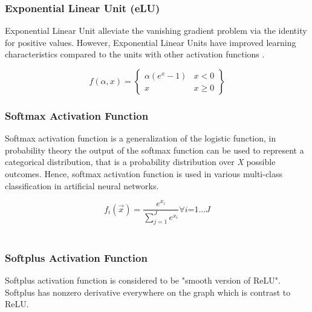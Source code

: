 \documentclass[12pt, a4paper]{report}
\begin{document}
\subsubsection{Exponential Linear Unit (eLU)}\label{sec:ELU}
Exponential Linear Unit alleviate the vanishing gradient problem via the identity for positive values. However, Exponential Linear Units have improved learning characteristics compared to the units with other activation functions \cite{ELU}.\\ \par
\begin{equation}\label{eq:ELU}
f(\alpha ,x) = \begin{Bmatrix}
\alpha(e^{x}-1) & x<0\\ 
x & x\geq 0 
\end{Bmatrix}
\end{equation}

\subsubsection{Softmax Activation Function}\label{sec:softmax}
Softmax activation function is a generalization of the logistic function, in probability theory the output of the softmax function can be used to represent a categorical distribution, that is a probability distribution over \textit{X} possible outcomes. Hence, softmax activation function is used in various multi-class classification in artificial neural networks.\\ \par
\begin{equation}\label{eq:softmax}
f_{i} (\overrightarrow{x}) =\frac{e^{x_{i}}}{\sum_{j=1}^{J} e^{x_{i}} }     \forall \textit{i=1...J}
\end{equation}
\\ \par

\subsubsection{Softplus Activation Function}\label{sec:softplus}
Softplus activation function is considered to be "smooth version of ReLU". Softplus has nonzero derivative everywhere on the graph which is contrast to ReLU.
\end{document}
